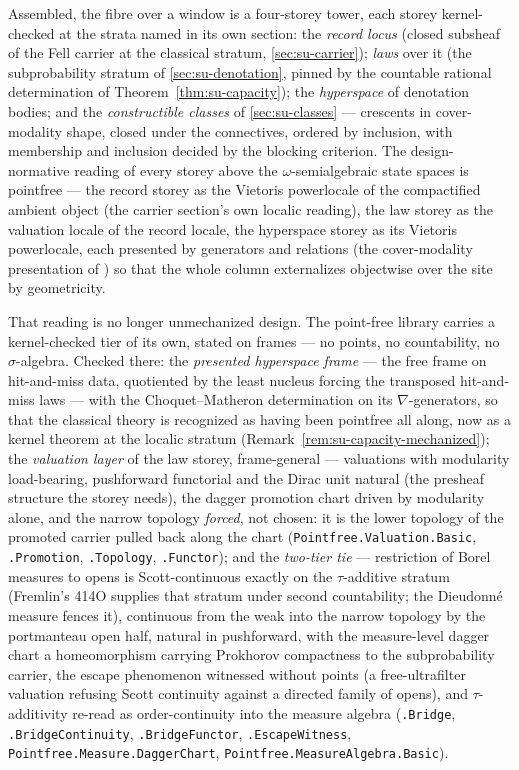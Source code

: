 \begin{remark}
\label{rem:su-fibre-column}
Assembled, the fibre over a window is a four-storey tower, each
storey kernel-checked at the strata named in its own section: the
\emph{record locus} (closed subsheaf of the Fell carrier at the
classical stratum,
\autoref{sec:su-carrier}); \emph{laws} over it (the
subprobability stratum of \autoref{sec:su-denotation},
pinned by the countable rational determination of
Theorem~\ref{thm:su-capacity}); the \emph{hyperspace} of denotation
bodies; and the \emph{constructible classes} of
\autoref{sec:su-classes} --- crescents in cover-modality shape,
closed under the connectives, ordered by inclusion, with
membership and inclusion decided by the blocking
criterion. The design-normative reading of every storey above the
$\omega$-semialgebraic state spaces is
pointfree --- the record storey as the Vietoris powerlocale of the
compactified ambient object (the carrier section's own localic
reading), the law storey as the valuation locale of the
record locale, the hyperspace storey as its Vietoris powerlocale,
each presented by generators and relations (the cover-modality
presentation of \cite{venema12}) so that the whole column
externalizes objectwise over the site by geometricity.

That reading is no longer unmechanized design. The point-free
library carries a kernel-checked tier of its own, stated on frames
--- no points, no countability, no $\sigma$-algebra. Checked there:
the \emph{presented hyperspace frame} --- the free frame on
hit-and-miss data, quotiented by the least nucleus forcing the
transposed hit-and-miss laws --- with the Choquet--Matheron
determination on its $\nabla$-generators, so that the classical
theory is recognized as having been pointfree all along, now as a
kernel theorem at the localic stratum
(Remark~\ref{rem:su-capacity-mechanized});
the \emph{valuation layer} of the law storey, frame-general ---
valuations with modularity load-bearing, pushforward functorial and
the Dirac unit natural (the presheaf structure the storey needs),
the dagger promotion chart driven by modularity alone, and the
narrow topology \emph{forced}, not chosen: it is the lower topology
of the promoted carrier pulled back along the chart
(\texttt{Pointfree.Valuation.Basic}, \texttt{.Promotion},
\texttt{.Topology}, \texttt{.Functor}); and the \emph{two-tier tie}
--- restriction of Borel measures to opens is Scott-continuous
exactly on the $\tau$-additive stratum (Fremlin's 414O supplies that
stratum under second countability; the Dieudonn\'e measure fences
it), continuous from the weak into the narrow topology by the
portmanteau open half, natural in pushforward, with the
measure-level dagger chart a homeomorphism carrying Prokhorov
compactness to the subprobability carrier, the escape phenomenon
witnessed without points (a free-ultrafilter valuation refusing
Scott continuity against a directed family of opens), and
$\tau$-additivity re-read as order-continuity into the measure
algebra (\texttt{.Bridge}, \texttt{.BridgeContinuity},
\texttt{.BridgeFunctor}, \texttt{.EscapeWitness},
\texttt{Pointfree.Measure.DaggerChart},
\texttt{Pointfree.MeasureAlgebra.Basic}).


\end{remark}
